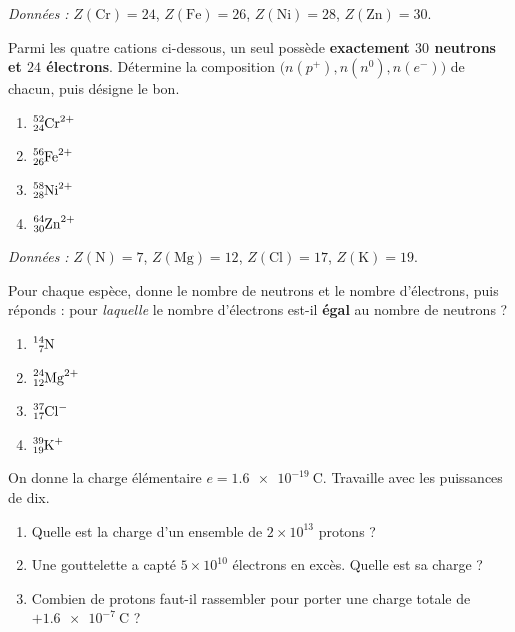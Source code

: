 \documentclass[11pt,a4paper]{article}
\begin{document}
\begin{exo}
\textit{Données :} $Z(\mathrm{Cr})=24$, $Z(\mathrm{Fe})=26$, $Z(\mathrm{Ni})=28$, $Z(\mathrm{Zn})=30$.

\smallskip
Parmi les quatre cations ci-dessous, un seul possède \textbf{exactement $30$ neutrons et $24$ électrons}.
Détermine la composition $\big(n(p^+),n(n^0),n(e^-)\big)$ de chacun, puis désigne le bon.
\begin{enumerate}[label=\alph*)]
  \item $\ce{^{52}_{24}Cr^{2+}}$
  \item $\ce{^{56}_{26}Fe^{2+}}$
  \item $\ce{^{58}_{28}Ni^{2+}}$
  \item $\ce{^{64}_{30}Zn^{2+}}$
\end{enumerate}
\end{exo}

\begin{exo}
\textit{Données :} $Z(\mathrm{N})=7$, $Z(\mathrm{Mg})=12$, $Z(\mathrm{Cl})=17$, $Z(\mathrm{K})=19$.

\smallskip
Pour chaque espèce, donne le nombre de neutrons et le nombre d'électrons, puis réponds : pour
\emph{laquelle} le nombre d'électrons est-il \textbf{égal} au nombre de neutrons ?
\begin{enumerate}[label=\alph*)]
  \item $\ce{^{14}_{7}N}$
  \item $\ce{^{24}_{12}Mg^{2+}}$
  \item $\ce{^{37}_{17}Cl^{-}}$
  \item $\ce{^{39}_{19}K^{+}}$
\end{enumerate}
\end{exo}

\begin{exo}
On donne la charge élémentaire $e = \SI{1,6e-19}{\coulomb}$. Travaille avec les puissances de dix.
\begin{enumerate}[label=\alph*)]
  \item Quelle est la charge d'un ensemble de $2 \times 10^{13}$ protons ?
  \item Une gouttelette a capté $5 \times 10^{10}$ électrons en excès. Quelle est sa charge ?
  \item Combien de protons faut-il rassembler pour porter une charge totale de
        $+\SI{1,6e-7}{\coulomb}$ ?
\end{enumerate}
\end{exo}
\end{document}
